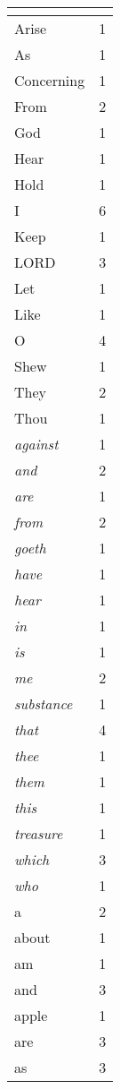 \begin{center}
\begin{longtable}{l|r}
\hline \multicolumn{2}{c}{{ }} \\ \hline
\endfoot 
Arise & 1\\ \hline 
As & 1\\ \hline 
Concerning & 1\\ \hline 
From & 2\\ \hline 
God & 1\\ \hline 
Hear & 1\\ \hline 
Hold & 1\\ \hline 
I & 6\\ \hline 
Keep & 1\\ \hline 
LORD & 3\\ \hline 
Let & 1\\ \hline 
Like & 1\\ \hline 
O & 4\\ \hline 
Shew & 1\\ \hline 
They & 2\\ \hline 
Thou & 1\\ \hline 
\emph{against} & 1\\ \hline 
\emph{and} & 2\\ \hline 
\emph{are} & 1\\ \hline 
\emph{from} & 2\\ \hline 
\emph{goeth} & 1\\ \hline 
\emph{have} & 1\\ \hline 
\emph{hear} & 1\\ \hline 
\emph{in} & 1\\ \hline 
\emph{is} & 1\\ \hline 
\emph{me} & 2\\ \hline 
\emph{substance} & 1\\ \hline 
\emph{that} & 4\\ \hline 
\emph{thee} & 1\\ \hline 
\emph{them} & 1\\ \hline 
\emph{this} & 1\\ \hline 
\emph{treasure} & 1\\ \hline 
\emph{which} & 3\\ \hline 
\emph{who} & 1\\ \hline 
a & 2\\ \hline 
about & 1\\ \hline 
am & 1\\ \hline 
and & 3\\ \hline 
apple & 1\\ \hline 
are & 3\\ \hline 
as & 3\\ \hline 

\end{longtable}
\end{center}
